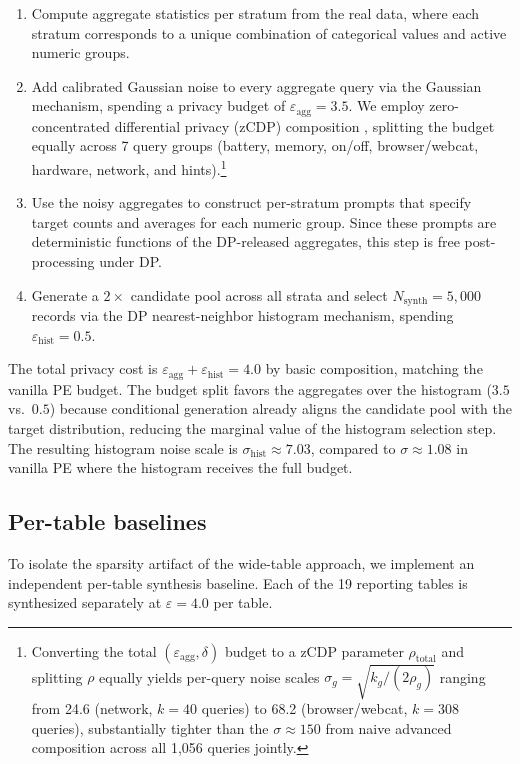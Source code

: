 \documentclass[12pt,letterpaper]{article}
\renewcommand{\_}{\textunderscore\allowbreak}
\begin{document}
\begin{enumerate}
    \item Compute aggregate statistics per stratum from the real data, where each stratum corresponds to a unique combination of categorical values and active numeric groups.
    \item Add calibrated Gaussian noise to every aggregate query via the Gaussian mechanism, spending a privacy budget of $\varepsilon_{\text{agg}} = 3.5$. We employ zero-concentrated differential privacy (zCDP) composition \citep{bun2016concentrated}, splitting the budget equally across 7 query groups (battery, memory, on/off, browser/webcat, hardware, network, and hints).\footnote{Converting the total $(\varepsilon_{\text{agg}}, \delta)$ budget to a zCDP parameter $\rho_{\text{total}}$ and splitting $\rho$ equally yields per-query noise scales $\sigma_g = \sqrt{k_g / (2\rho_g)}$ ranging from 24.6 (network, $k=40$ queries) to 68.2 (browser/webcat, $k=308$ queries), substantially tighter than the $\sigma \approx 150$ from naive advanced composition across all 1{,}056 queries jointly.}
    \item Use the noisy aggregates to construct per-stratum prompts that specify target counts and averages for each numeric group. Since these prompts are deterministic functions of the DP-released aggregates, this step is free post-processing under DP.
    \item Generate a $2\times$ candidate pool across all strata and select $N_{\text{synth}} = 5{,}000$ records via the DP nearest-neighbor histogram mechanism, spending $\varepsilon_{\text{hist}} = 0.5$.
\end{enumerate}

The total privacy cost is $\varepsilon_{\text{agg}} + \varepsilon_{\text{hist}} = 4.0$ by basic composition, matching the vanilla PE budget. The budget split favors the aggregates over the histogram ($3.5$ vs.\ $0.5$) because conditional generation already aligns the candidate pool with the target distribution, reducing the marginal value of the histogram selection step. The resulting histogram noise scale is $\sigma_{\text{hist}} \approx 7.03$, compared to $\sigma \approx 1.08$ in vanilla PE where the histogram receives the full budget.

\subsection{Per-table baselines}
\label{sec:methods-pertable}

To isolate the sparsity artifact of the wide-table approach, we implement an independent per-table synthesis baseline. Each of the 19 reporting tables is synthesized separately at $\varepsilon = 4.0$ per table.
\end{document}
